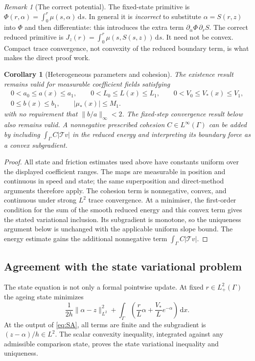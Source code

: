 \documentclass[11pt,a4paper]{article}
\newtheorem{corollary}[theorem]{Corollary}
\theoremstyle{definition}\newtheorem{definition}[theorem]{Definition}
\theoremstyle{remark}\newtheorem{remark}[theorem]{Remark}
\newcommand{\dd}{\,\mathrm d}
\newcommand{\norm}[1]{\lVert #1\rVert}
\newcommand{\tr}{\mathcal T}
\numberwithin{equation}{section}
\begin{document}
\begin{remark}[The correct potential]\label{rem:correctpotential}
The fixed-state primitive is $\Phi(r,\alpha)=\int_0^r\mu(s,\alpha)\dd s$. In general it is \emph{incorrect} to substitute $\alpha=S(r,z)$ into $\Phi$ and then differentiate: this introduces the extra term $\partial_\alpha\Phi\,\partial_rS$. The correct reduced primitive is $J_z(r)=\int_0^r\mu(s,S(s,z))\dd s$. It need not be convex. Compact trace convergence, not convexity of the reduced boundary term, is what makes the direct proof work.
\end{remark}

\begin{corollary}[Heterogeneous parameters and cohesion]\label{cor:heterogeneous}
The existence result remains valid for measurable coefficient fields satisfying
\[
 \begin{gathered}
 0<a_0\le a(x)\le a_1,\qquad 0<L_0\le L(x)\le L_1,\qquad
 0<V_0\le V_*(x)\le V_1,\\
 0\le b(x)\le b_1,\qquad |\mu_*(x)|\le M_1.
 \end{gathered}
\]
with no requirement that $\norm{b/a}_\infty<2$. The fixed-step convergence result below also remains valid. A nonnegative prescribed cohesion $C\in L^\infty(\Gamma)$ can be added by including $\int_\Gamma C|\tr v|$ in the reduced energy and interpreting its boundary force as a convex subgradient.
\end{corollary}
\begin{proof}
All state and friction estimates used above have constants uniform over the displayed coefficient ranges. The maps are measurable in position and continuous in speed and state; the same superposition and direct-method arguments therefore apply. The cohesion term is nonnegative, convex, and continuous under strong $L^2$ trace convergence. At a minimiser, the first-order condition for the sum of the smooth reduced energy and this convex term gives the stated variational inclusion. Its subgradient is monotone, so the uniqueness argument below is unchanged with the applicable uniform slope bound. The energy estimate gains the additional nonnegative term $\int_\Gamma C|\tr v|$.
\end{proof}

\subsection{Agreement with the state variational problem}
The state equation is not only a formal pointwise update. At fixed $r\in L^2_+(\Gamma)$ the ageing state minimizes
\[
 \frac1{2h}\norm{\alpha-z}_{L^2}^2
 +\int_\Gamma\left(\frac rL\alpha+\frac{V_*}{L}e^{-\alpha}\right)\dd x.
\]
At the output of \eqref{eq:SA}, all terms are finite and the subgradient is $(z-\alpha)/h\in L^2$. The scalar convexity inequality, integrated against any admissible comparison state, proves the state variational inequality and uniqueness.
\end{document}
